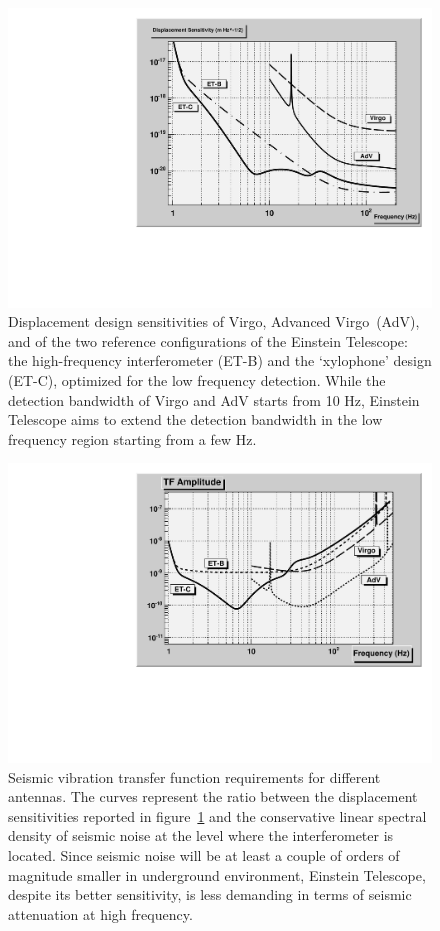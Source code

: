 %
\begin{figure}[t!]
	\begin{center}
		 \includegraphics[width=16cm]{./Sec_Suspensions/Figures/Fig2.pdf}
			\caption{Displacement design sensitivities of Virgo, Advanced Virgo~(AdV), and of the two reference configurations of the Einstein Telescope: the high-frequency interferometer (ET-B) and the `xylophone' design (ET-C), optimized for the low frequency detection. While the detection bandwidth of Virgo and AdV starts from 10 Hz, Einstein Telescope aims to extend the detection bandwidth in the low frequency region starting from a few Hz.}
\label{FigSusp2}
	\end{center}
\end{figure}
%
\begin{figure}[t!]
	\begin{center}
		\includegraphics[width=16cm]{./Sec_Suspensions/Figures/Fig3.pdf}
			\caption{Seismic vibration transfer function requirements for different antennas. The curves represent the ratio between the displacement sensitivities reported in figure~\ref{FigSusp2} and the conservative linear spectral density of seismic noise at the level where the interferometer is located. Since seismic noise will be at least a couple of orders of magnitude smaller in underground environment, Einstein Telescope, despite its better sensitivity, is less demanding in terms of seismic attenuation at high frequency.}
\label{FigSusp3}
	\end{center}
\end{figure}
